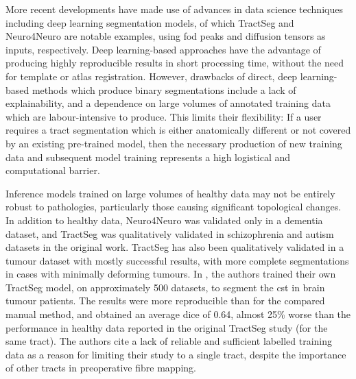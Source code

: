 More recent developments have made use of advances in data science techniques including deep learning segmentation models, of which TractSeg\autocite{Wasserthal2018} and Neuro4Neuro\autocite{Li2020} are notable examples, using \gls{fod} peaks and diffusion tensors as inputs, respectively.
Deep learning-based approaches have the advantage of producing highly reproducible results in short processing time, without the need for template or atlas registration.
However, drawbacks of direct, deep learning-based methods which produce binary segmentations include a lack of explainability, and a dependence on large volumes of annotated training data which are labour-intensive to produce.
This limits their flexibility:
If a user requires a tract segmentation which is either anatomically different or not covered by an existing pre-trained model, then the necessary production of new training data and subsequent model training represents a high logistical and computational barrier.

Inference models trained on large volumes of healthy data may not be entirely robust to pathologies, particularly those causing significant topological changes.
In addition to healthy data, Neuro4Neuro\autocite{Li2020} was validated only in a dementia dataset, and TractSeg\autocite{Wasserthal2018} was qualitatively validated in schizophrenia and autism datasets in the original work.
TractSeg has also been qualitatively validated in a tumour dataset with mostly successful results, with more complete segmentations in cases with minimally deforming tumours.\autocite{Richards2021}
In \textcite{Moshe2022}, the authors trained their own TractSeg model, on approximately 500 datasets, to segment the \gls{cst} in brain tumour patients.
The results were more reproducible than for the compared manual method, and obtained an average \gls{dice} of 0.64, almost 25\% worse than the performance in healthy data reported in the original TractSeg study (for the same tract).
The authors cite a lack of reliable and sufficient labelled training data as a reason for limiting their study to a single tract, despite the importance of other tracts in preoperative fibre mapping.
